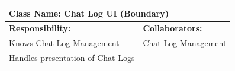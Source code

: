 \documentclass[]{article}
\begin{document}
\begin{table}[!ht]
	\centering
	\begin{tabular}{|p{7cm}|p{7cm}|}
		\hline
		\multicolumn{2}{|l|}{\textbf{Class Name:} Chat Log UI (Boundary)} \\
		\hline
		\textbf{Responsibility:}          & \textbf{Collaborators:}       \\
		\hline
		Knows Chat Log Management         & Chat Log Management           \\
		Handles presentation of Chat Logs &                               \\
		\hline
	\end{tabular}
\end{table}



\end{document}
